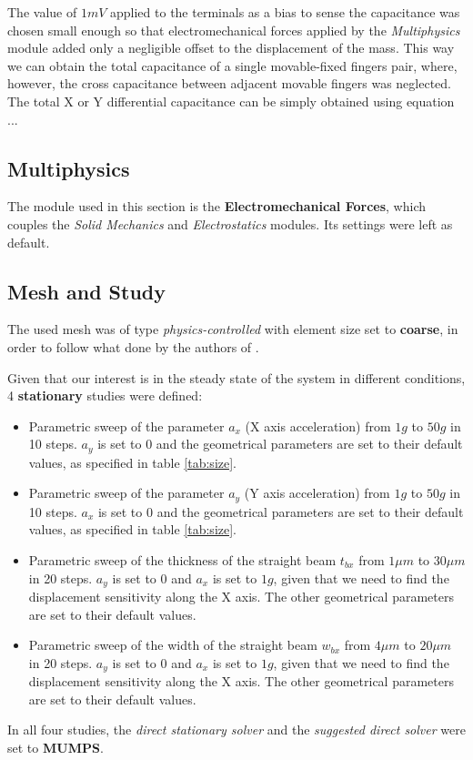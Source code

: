 \documentclass[lettersize,journal]{IEEEtran}
\begin{document}
        The value of \(1mV\) applied to the terminals as a bias to sense the capacitance was chosen small enough so that electromechanical forces applied by the \textit{Multiphysics} module added only a negligible offset to the displacement of the mass. This way we can obtain the total capacitance of a single movable-fixed fingers pair, where, however, the cross capacitance between adjacent movable fingers was neglected.
        The total X or Y differential capacitance can be simply obtained using equation ...
        
        \bigskip
        \subsection{Multiphysics}        
        The module used in this section is the \textbf{Electromechanical Forces}, which couples the \textit{Solid Mechanics} and \textit{Electrostatics} modules. Its settings were left as default.
        
        \fi
        \subsection{Mesh and Study}
        The used mesh was of type \textit{physics-controlled} with element size set to \textbf{coarse}, in order to follow what done by the authors of \cite{original}.
        
        Given that our interest is in the steady state of the system in different conditions, 4 \textbf{stationary} studies were defined:
        \begin{itemize}
            \item Parametric sweep of the parameter \(a_x\) (X axis acceleration) from \(1g\) to \(50g\) in 10 steps. \(a_y\) is set to 0 and the geometrical parameters are set to their default values, as specified in table \ref{tab:size}.
            \item Parametric sweep of the parameter \(a_y\) (Y axis acceleration) from \(1g\) to \(50g\) in 10 steps. \(a_x\) is set to 0 and the geometrical parameters are set to their default values, as specified in table \ref{tab:size}.
            \item Parametric sweep of the thickness of the straight beam \(t_{bx}\) from \(1\mu m\) to \(30\mu m\) in 20 steps. \(a_y\) is set to 0 and \(a_x\) is set to \(1g\), given that we need to find the displacement sensitivity along the X axis. The other geometrical parameters are set to their default values.
            \item Parametric sweep of the width of the straight beam \(w_{bx}\) from \(4\mu m\) to \(20\mu m\) in 20 steps. \(a_y\) is set to 0 and \(a_x\) is set to \(1g\), given that we need to find the displacement sensitivity along the X axis. The other geometrical parameters are set to their default values.
        \end{itemize}
        In all four studies, the \textit{direct stationary solver} and the \textit{suggested direct solver} were set to \textbf{MUMPS}.
        
\end{document}
